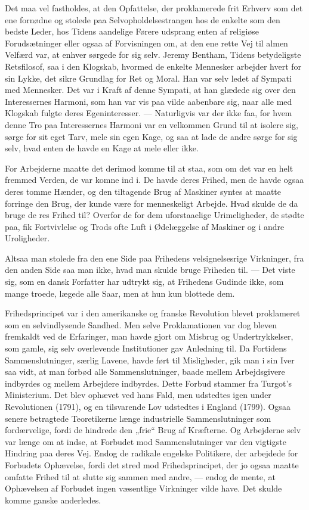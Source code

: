 \documentclass[12pt,a4paper,openany]{book}
\newcommand{\opage}[1]{\marginnote{\footnotesize\textit{[#1]}}}
\begin{document}
Det maa vel fastholdes, at den Opfattelse, der proklamerede frit
Erhverv som det ene fornødne og stolede paa Selvopholdelsestrangen
hos de enkelte som den bedste Leder, hos Tidens aandelige Førere
udsprang enten af religiøse Forudsætninger eller ogsaa af Forvisningen
om, at den ene rette Vej til almen Velfærd var, at enhver
sørgede for sig selv. Jeremy Bentham, Tidens betydeligste Retsfilosof,
saa i den Klogskab, hvormed de enkelte Mennesker arbejder
hvert for sin Lykke, det sikre Grundlag for Ret og Moral. Han var
selv ledet af Sympati med Mennesker. Det var i Kraft af denne Sympati,
at han glædede sig over den Interessernes Harmoni, som han
var vis paa vilde aabenbare sig, naar alle med Klogskab fulgte deres
Egeninteresser. --- Naturligvis var der ikke faa, for hvem denne
Tro paa Interessernes Harmoni var en velkommen Grund til at isolere
sig, sørge for sit eget Tarv, mele sin egen Kage, og saa at lade
de andre sørge for sig selv, hvad enten de havde en Kage at mele
eller ikke.

For Arbejderne maatte det derimod komme til at staa, som om
det var en helt fremmed Verden, de var komne ind i. De havde deres
Frihed, men de havde ogsaa deres tomme Hænder, og den tiltagende
Brug af Maskiner syntes at maatte forringe den Brug, der
kunde være for menneskeligt Arbejde. Hvad skulde de da bruge de%
\opage{90}res Frihed til? Overfor de for dem uforstaaelige Urimeligheder, de
stødte paa, fik Fortvivlelse og Trods ofte Luft i Ødelæggelse af Maskiner
og i andre Uroligheder.

Altsaa man stolede fra den ene Side paa Frihedens velsignelsesrige
Virkninger, fra den anden Side saa man ikke, hvad man skulde
bruge Friheden til. --- Det viste sig, som en dansk Forfatter har udtrykt
sig, at Frihedens Gudinde ikke, som mange troede, lægede alle
Saar, men at hun kun blottede dem.

Frihedsprincipet var i den amerikanske og franske Revolution blevet
proklameret som en selvindlysende Sandhed. Men selve Proklamationen
var dog bleven fremkaldt ved de Erfaringer, man havde
gjort om Misbrug og Undertrykkelser, som gamle, sig selv overlevende
Institutioner gav Anledning til. Da Fortidens Sammenslutninger,
særlig Lavene, havde ført til Misligheder, gik man i sin Iver
saa vidt, at man forbød alle Sammenslutninger, baade mellem Arbejdsgivere
indbyrdes og mellem Arbejdere indbyrdes. Dette Forbud
stammer fra Turgot’s Ministerium. Det blev ophævet ved hans
Fald, men udstedtes igen under Revolutionen (1791), og en tilsvarende
Lov udstedtes i England (1799). Ogsaa senere betragtede Teoretikerne
længe industrielle Sammenslutninger som fordærvelige,
fordi de hindrede den „frie“ Brug af Kræfterne. Og Arbejderne selv
var længe om at indse, at Forbudet mod Sammenslutninger var den
vigtigste Hindring paa deres Vej. Endog de radikale engelske Politikere,
der arbejdede for Forbudets Ophævelse, fordi det stred mod
Frihedsprincipet, der jo ogsaa maatte omfatte Frihed til at slutte
sig sammen med andre, --- endog de mente, at Ophævelsen af Forbudet
ingen væsentlige Virkninger vilde have. Det skulde komme
ganske anderledes.
\end{document}
